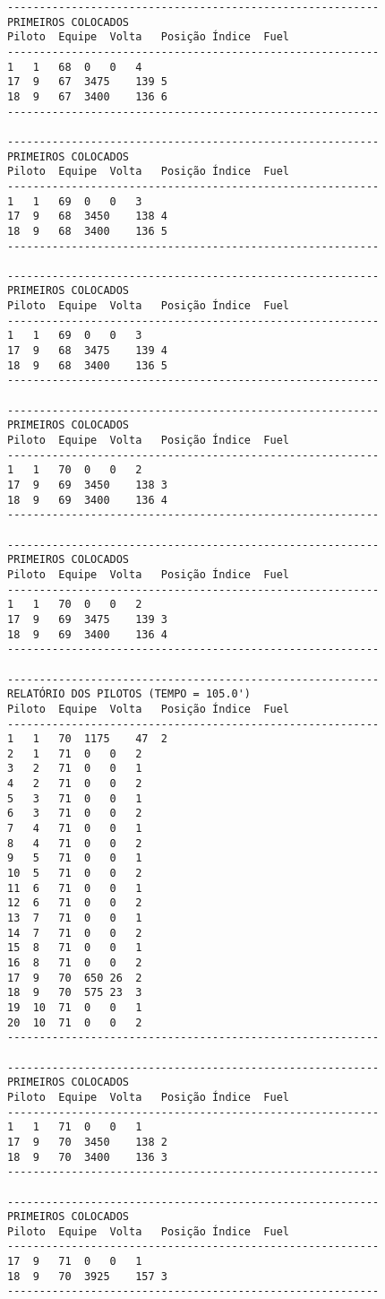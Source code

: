 \documentclass[12pt]{article}
\begin{document}
\begin{verbatim}
----------------------------------------------------------
PRIMEIROS COLOCADOS
Piloto	Equipe	Volta	Posição	Índice	Fuel
----------------------------------------------------------
1	1	68	0	0	4
17	9	67	3475	139	5
18	9	67	3400	136	6
----------------------------------------------------------

----------------------------------------------------------
PRIMEIROS COLOCADOS
Piloto	Equipe	Volta	Posição	Índice	Fuel
----------------------------------------------------------
1	1	69	0	0	3
17	9	68	3450	138	4
18	9	68	3400	136	5
----------------------------------------------------------

----------------------------------------------------------
PRIMEIROS COLOCADOS
Piloto	Equipe	Volta	Posição	Índice	Fuel
----------------------------------------------------------
1	1	69	0	0	3
17	9	68	3475	139	4
18	9	68	3400	136	5
----------------------------------------------------------

----------------------------------------------------------
PRIMEIROS COLOCADOS
Piloto	Equipe	Volta	Posição	Índice	Fuel
----------------------------------------------------------
1	1	70	0	0	2
17	9	69	3450	138	3
18	9	69	3400	136	4
----------------------------------------------------------

----------------------------------------------------------
PRIMEIROS COLOCADOS
Piloto	Equipe	Volta	Posição	Índice	Fuel
----------------------------------------------------------
1	1	70	0	0	2
17	9	69	3475	139	3
18	9	69	3400	136	4
----------------------------------------------------------

----------------------------------------------------------
RELATÓRIO DOS PILOTOS (TEMPO = 105.0')
Piloto	Equipe	Volta	Posição	Índice	Fuel
----------------------------------------------------------
1	1	70	1175	47	2
2	1	71	0	0	2
3	2	71	0	0	1
4	2	71	0	0	2
5	3	71	0	0	1
6	3	71	0	0	2
7	4	71	0	0	1
8	4	71	0	0	2
9	5	71	0	0	1
10	5	71	0	0	2
11	6	71	0	0	1
12	6	71	0	0	2
13	7	71	0	0	1
14	7	71	0	0	2
15	8	71	0	0	1
16	8	71	0	0	2
17	9	70	650	26	2
18	9	70	575	23	3
19	10	71	0	0	1
20	10	71	0	0	2
----------------------------------------------------------

----------------------------------------------------------
PRIMEIROS COLOCADOS
Piloto	Equipe	Volta	Posição	Índice	Fuel
----------------------------------------------------------
1	1	71	0	0	1
17	9	70	3450	138	2
18	9	70	3400	136	3
----------------------------------------------------------

----------------------------------------------------------
PRIMEIROS COLOCADOS
Piloto	Equipe	Volta	Posição	Índice	Fuel
----------------------------------------------------------
17	9	71	0	0	1
18	9	70	3925	157	3
----------------------------------------------------------


\end{verbatim}
\end{document}
